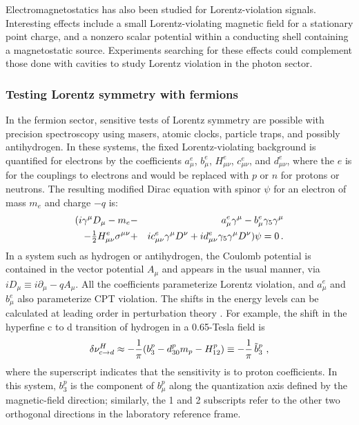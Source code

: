 \documentclass[twocolumn]{revtex4}
\def\ga{\gamma}
\def\ps{\psi}
\def\si{\sigma}
\def\de{\delta}
\def\fr#1#2{{{#1} \over {#2}}}
\def\bt{\tilde b}
\newcommand{\beq}{\begin{equation}}
\newcommand{\eeq}{\end{equation}}
\def\half{{\textstyle{1\over 2}}}
\newcommand{\bea}{\begin{eqnarray}}
\newcommand{\eea}{\end{eqnarray}}
\begin{document}
Electromagnetostatics
has also been studied \cite{qbak}
for Lorentz-violation signals.
Interesting effects include
a small Lorentz-violating magnetic field
for a stationary point charge,
and a nonzero scalar potential
within a conducting shell containing a magnetostatic source.
Experiments searching for these effects could complement
those done with cavities to study Lorentz violation in the photon sector.

\subsubsection{Testing Lorentz symmetry with fermions}
In the fermion sector,
sensitive tests of Lorentz symmetry
are possible with precision spectroscopy
using masers, atomic clocks, particle traps,
and possibly antihydrogen.
In these systems,
the fixed Lorentz-violating background is quantified for electrons
by the coefficients
$a_\mu^e$, $b_\mu^e$, $H_{\mu \nu}^e$, $c_{\mu \nu}^e$,
and $d_{\mu \nu}^e$,
where the $e$ is for the couplings to electrons
and would be replaced with $p$ or $n$ for protons or neutrons.
The resulting modified Dirac equation
with spinor $\ps$ for an electron of mass $m_e$
and charge $-q$ is:
\bea
( i \ga^\mu D_\mu - m_e &-& a_\mu^e \ga^\mu
- b_\mu^e \ga_5 \ga^\mu
\nonumber \\
- \half H_{\mu \nu}^e \si^{\mu \nu}
&+& i c_{\mu \nu}^e \ga^\mu D^\nu
+ i d_{\mu \nu}^e \ga_5 \ga^\mu D^\nu ) \ps = 0
\, .
\label{dirac}
\eea
In a system such as hydrogen or antihydrogen,
the Coulomb potential is contained in
the vector potential $A_\mu$ and appears in the usual manner,
via $i D_\mu \equiv i \partial_\mu - q A_\mu$.
All the coefficients parameterize Lorentz violation,
and $a_\mu^e$ and $b_\mu^e$
also parameterize CPT violation.
The shifts in the energy levels can be calculated
at leading order in perturbation theory \cite{hbar}.
For example, the shift in the hyperfine c to d transition
of hydrogen in a 0.65-Tesla field is
\beq
 \de\nu^H_{c \rightarrow d}
 \approx - \fr{1}{\pi} (b_3^p - d_{30}^p m_p - H_{12}^p)
 \equiv - \fr{1}{\pi} \, \bt^p_3 \ ,
\label{h_shift}
\eeq
where the superscript indicates that the sensitivity is to proton coefficients.
In this system,
$b_3^p$ is the component of $b_\mu^p$
along the quantization axis
defined by the magnetic-field direction;
similarly,
the 1 and 2 subscripts refer to the other two orthogonal directions
in the laboratory reference frame.
\end{document}
